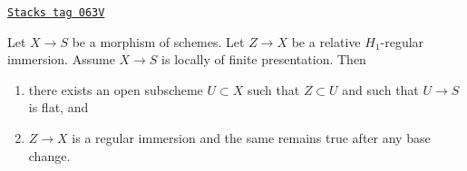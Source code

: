 \begin{lemma}
\label{divisors-lemma-flat-relative-H1-regular}
\href{https://stacks.math.columbia.edu/tag/063V}{\texttt{Stacks tag 063V}}

Let $X \to S$ be a morphism of schemes.
Let $Z \to X$ be a relative $H_1$-regular immersion.
Assume $X \to S$ is locally of finite presentation. Then
\begin{enumerate}
\item there exists an open subscheme $U \subset X$ such that
$Z \subset U$ and such that $U \to S$ is flat, and
\item $Z \to X$ is a regular immersion and the same remains
true after any base change.
\end{enumerate}
\end{lemma}

